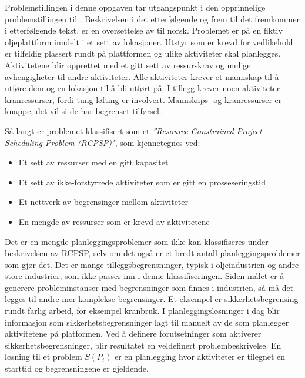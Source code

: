 Problemstillingen i denne oppgaven tar utgangspunkt i den opprinnelige problemstillingen til \bht. Beskrivelsen i det etterfølgende og frem til det fremkommer i etterfølgende tekst, er en oversettelse av \cite{tvedtbezem} til norsk. Problemet er på en fiktiv oljeplattform inndelt i et sett av lokasjoner. Utstyr som er krevd for vedlikehold er tilfeldig plassert rundt på plattformen og ulike aktiviteter skal planlegges. Aktivitetene blir opprettet med et gitt sett av ressurskrav og mulige avhengigheter til andre aktiviteter. Alle aktiviteter krever et mannskap til å utføre dem og en lokasjon til å bli utført på. I tillegg krever noen aktiviteter kranressurser, fordi tung løfting er involvert. Mannskaps- og kranressurser er knappe, det vil si de har begrenset tilførsel.

Så langt er problemet klassifisert som et \textit{''Resource-Constrained Project Scheduling Problem (RCPSP)"}\cite{RcpspPaperSchutt}, som kjennetegnes ved:
\begin{itemize}
\item Et sett av ressurser med en gitt kapasitet
\item Et sett av ikke-forstyrrede aktiviteter som er gitt en prosseseringstid
\item Et nettverk av begrensinger mellom aktiviteter
\item En mengde av ressurser som er krevd av aktivitetene
\end{itemize}

Det er en mengde planleggingsproblemer som ikke kan klassifiseres under beskrivelsen av RCPSP, selv om det også er et bredt antall planleggingsproblemer som gjør det. Det er mange tilleggsbegrensninger, typisk i oljeindustrien og andre store industrier, som ikke passer inn i denne klassifiseringen. Siden målet er å generere probleminstanser med begrensninger som finnes i industrien, så må det legges til andre mer komplekse begrensinger. Et eksempel  er sikkerhetsbegrensing rundt farlig arbeid, for eksempel kranbruk. I planleggingsløsninger i dag blir informasjon som sikkerhetsbegrensninger lagt til manuelt av de som planlegger aktivitetene på platformen. Ved å definere forutsetninger som aktiverer sikkerhetsbegrensninger, blir resultatet en veldefinert problembeskrivelse. En løsning til et problem $ S(P_{i}) $ er en planlegging hvor aktiviteter er tilegnet en starttid og begrensningene er gjeldende.


